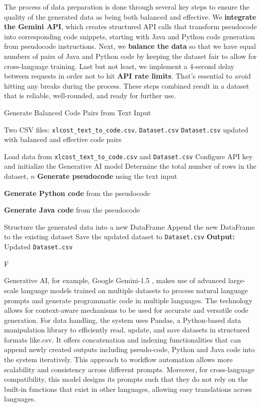 \documentclass{dhbenelux}
\begin{document}
The process of data preparation is done through several key steps to ensure the quality of the generated data as being both balanced and effective. We \textbf{integrate the Gemini API}, which creates structured API calls that transform pseudocode into corresponding code snippets, starting with Java and Python code generation from pseudocode instructions. Next, we \textbf{balance the data} so that we have equal numbers of pairs of Java and Python code by keeping the dataset fair to allow for cross-language training. Last but not least, we implement a 4-second delay between requests in order not to hit \textbf{API rate limits}. That's essential to avoid hitting any breaks during the process. These steps combined result in a dataset that is reliable, well-rounded, and ready for further use.

\begin{algorithm}
\caption{Generate Balanced Code Pairs from Text Input}
\label{alg:balanced_code_pairs}
\begin{algorithmic}[1]
\Require Two CSV files: \texttt{xlcost\_text\_to\_code.csv}, \texttt{Dataset.csv}
\Ensure \texttt{Dataset.csv} updated with balanced and effective code pairs

\State Load data from \texttt{xlcost\_text\_to\_code.csv} and \texttt{Dataset.csv}
\State Configure API key and initialize the Generative AI model
\State Determine the total number of rows in the dataset, $n$
    \State \textbf{Generate pseudocode} using the text input
    
    \State \textbf{Generate Python code} from the pseudocode
   
    \State \textbf{Generate Java code} from the pseudocode
 
    \State Structure the generated data into a new DataFrame
    \State Append the new DataFrame to the existing dataset
    \State Save the updated dataset to \texttt{Dataset.csv}
\EndFor
\State \textbf{Output:} Updated \texttt{Dataset.csv}
\end{algorithmic}F
\label{alg:generate-balanced-code}
\end{algorithm}

Generative AI, for example, Google Gemini-1.5 \cite{gemini2023}, makes use of advanced large-scale language models trained on multiple datasets to process natural language prompts and generate programmatic code in multiple languages. The technology allows for context-aware mechanisms to be used for accurate and versatile code generation. For data handling, the system uses Pandas, a Python-based data manipulation library to efficiently read, update, and save datasets in structured formats like.csv. It offers concatenation and indexing functionalities that can append newly created outputs including pseudo-code, Python and Java code into the system iteratively. This approach to workflow automation allows more scalability and consistency across different prompts. Moreover, for cross-language compatibility, this model designs its prompts such that they do not rely on the built-in functions that exist in other languages, allowing easy translations across languages.
\end{document}
